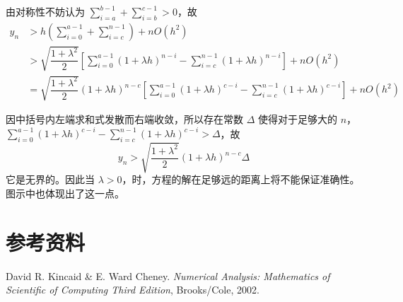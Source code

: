 \documentclass{ctexart}
\begin{document}
	由对称性不妨认为 $\displaystyle\sum_{i = a}^{b - 1} + \displaystyle\sum_{i = b}^{c - 1} > 0$，故
	\begin{align*}
		y_n & > h \left(\sum_{i = 0}^{a - 1} + \sum_{i = c}^{n - 1}\right) + n O(h^2)\\
		& > \sqrt{\dfrac{1 + \lambda^2}{2}} \left[\sum_{i = 0}^{a - 1}(1 + \lambda h)^{n - i} - \sum_{i = c}^{n - 1}(1 + \lambda h)^{n - i} \right] + n O(h^2)\\
		& = \sqrt{\dfrac{1 + \lambda^2}{2}} (1 + \lambda h)^{n - c} \left[\sum_{i = 0}^{a - 1}(1 + \lambda h)^{c - i} - \sum_{i = c}^{n - 1}(1 + \lambda h)^{c - i}\right] + n O(h^2)
	\end{align*}
	
	因中括号内左端求和式发散而右端收敛，所以存在常数 $\Delta$ 使得对于足够大的 $n$，$\displaystyle\sum_{i = 0}^{a - 1}(1 + \lambda h)^{c - i} - \displaystyle\sum_{i = c}^{n - 1}(1 + \lambda h)^{c - i} > \Delta$，故
	\begin{equation}
		y_n > \sqrt{\dfrac{1 + \lambda^2}{2}} (1 + \lambda h)^{n - c} \Delta
	\end{equation}
	它是无界的。因此当 $\lambda > 0$，时，方程的解在足够远的距离上将不能保证准确性。图示中也体现出了这一点。
	
\section*{参考资料}
	\noindent [1] David R. Kincaid \& E. Ward Cheney. {\it Numerical Analysis: Mathematics of Scientific of Computing Third Edition}, Brooks/Cole, 2002.
\end{document}
